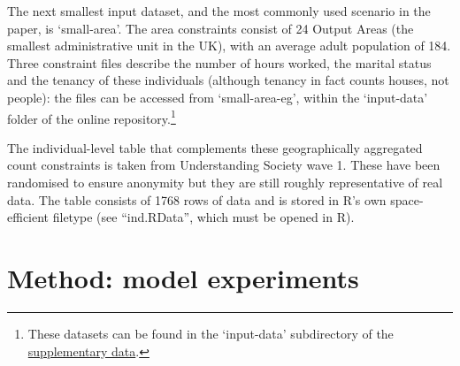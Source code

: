 \documentclass[a4paper,10pt]{article}
\begin{document}
The next smallest input dataset, and the most commonly used scenario in the paper, 
is `small-area'. The area constraints consist of 24 Output Areas (the smallest 
administrative unit in the UK), with an average adult population of 184.
Three constraint files describe the number of hours worked, the marital status and the
tenancy of these 
individuals (although tenancy in fact counts houses, not people): the files can
be accessed from `small-area-eg', within the `input-data' folder of the online
repository.\footnote{These datasets can be found in the `input-data'
subdirectory of the \href{http://tinyurl.com/lgw6zev}{supplementary data}.}
% 

The individual-level table that complements these geographically aggregated count constraints 
is taken from Understanding Society wave 1. These have been randomised to ensure anonymity
but they are still roughly representative of real data. The table consists of 1768 rows of 
data and is stored in R’s own space-efficient filetype (see ``ind.RData'', which must be opened in 
R).




\section{Method: model experiments}
\end{document}
